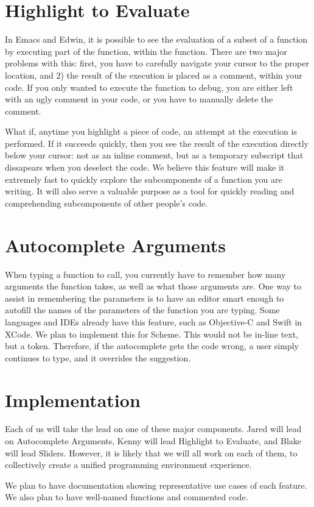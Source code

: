\documentclass[11pt]{article}
\begin{document}
\section{Highlight to Evaluate}

In Emacs and Edwin, it is possible to see the evaluation of a subset of a function by executing part of the function, within the function. There are two major problems with this: first, you have to carefully navigate your cursor to the proper location, and 2) the result of the execution is placed as a comment, within your code. If you only wanted to execute the function to debug, you are either left with an ugly comment in your code, or you have to manually delete the comment.

What if, anytime you highlight a piece of code, an attempt at the execution is performed. If it succeeds quickly, then you see the result of the execution directly below your cursor: not as an inline comment, but as a temporary subscript that dissapears when you deselect the code. We believe this feature will make it extremely fast to quickly explore the subcomponents of a function you are writing. It will also serve a valuable purpose as a tool for quickly reading and comprehending subcomponents of other people's code.

\section{Autocomplete Arguments}

When typing a function to call, you currently have to remember how many arguments the function takes, as well as what those arguments are. One way to assist in remembering the parameters is to have an editor smart enough to autofill the names of the parameters of the function you are typing. Some languages and IDEs already have this feature, such as Objective-C and Swift in XCode. We plan to implement this for Scheme. This would not be in-line text, but a token. Therefore, if the autocomplete gets the code wrong, a user simply continues to type, and it overrides the suggestion.

\section*{Implementation}

Each of us will take the lead on one of these major components. Jared will lead on Autocomplete Arguments, Kenny will lead Highlight to Evaluate, and Blake will lead Sliders. However, it is likely that we will all work on each of them, to collectively create a unified programming environment experience.

We plan to have documentation showing representative use cases of each feature. We also plan to have well-named functions and commented code.
\end{document}
